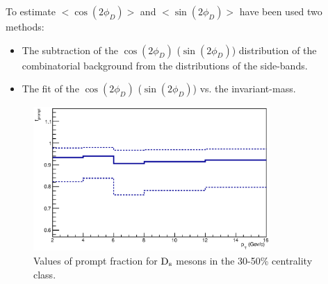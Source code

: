 To estimate $< \cos(2\phi_D) >$ and $< \sin(2\phi_D) >$ 
have been used two methods:
\begin{itemize}
\item The subtraction of the $\cos(2\phi_D)$ ($\sin(2\phi_D)$) 
distribution of the combinatorial background from the distributions of the side-bands.
\item The fit of the $\cos(2\phi_D)$ ($\sin(2\phi_D)$) vs. the invariant-mass.
\end{itemize}
\fi
\begin{figure}
 \centering
 \includegraphics[width=9cm]{FigCap5/fprompt_3050.eps}
\caption{Values of prompt fraction for ${\rm D_s}$ mesons in the 30-50\% centrality class.}
\label{fig:fPrompt}
\end{figure}

